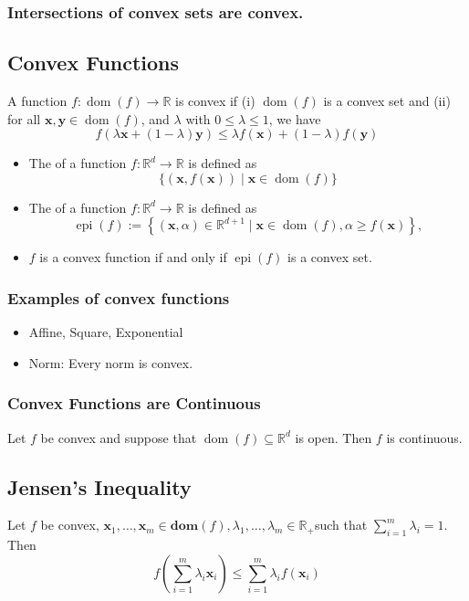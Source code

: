 \subsubsection*{Intersections of convex sets are convex.}

\subsection*{Convex Functions}
A function $f: \operatorname{dom}(f) \rightarrow \mathbb{R}$ is convex if (i) $\operatorname{dom}(f)$ is a convex set and (ii) for all $\mathbf{x}, \mathbf{y} \in \operatorname{dom}(f)$, and $\lambda$ with $0 \leq \lambda \leq 1$, we have
$$
f(\lambda \mathbf{x}+(1-\lambda) \mathbf{y}) \leq \lambda f(\mathbf{x})+(1-\lambda) f(\mathbf{y})
$$

\begin{itemize}[leftmargin=*]
    \item The  of a function $f: \mathbb{R}^{d} \rightarrow \mathbb{R}$ is defined as
        $$
        \{(\mathbf{x}, f(\mathbf{x})) \mid \mathbf{x} \in \operatorname{dom}(f)\}
        $$
    \item The  of a function $f: \mathbb{R}^{d} \rightarrow \mathbb{R}$ is defined as
$$
\operatorname{epi}(f):=\left\{(\mathbf{x}, \alpha) \in \mathbb{R}^{d+1} \mid \mathbf{x} \in \operatorname{dom}(f), \alpha \geq f(\mathbf{x})\right\},
$$
    \item $f$ is a convex function if and only if $\operatorname{epi}(f)$ is a convex set.
\end{itemize}

\subsubsection*{Examples of convex functions} 
\begin{itemize}[leftmargin=*]
    \item Affine, Square, Exponential
    \item Norm: Every norm is convex.
\end{itemize}

\subsubsection*{Convex Functions are Continuous}
Let $f$ be convex and suppose that $\operatorname{dom}(f) \subseteq \mathbb{R}^{d}$ is open. Then $f$ is continuous.

\subsection*{Jensen's Inequality}
Let $f$ be convex, $\mathbf{x}_{1}, \ldots, \mathbf{x}_{m} \in \mathbf{d o m}(f), \lambda_{1}, \ldots, \lambda_{m} \in \mathbb{R}_{+}$such that $\sum_{i=1}^{m} \lambda_{i}=1$. Then
$$
f\left(\sum_{i=1}^{m} \lambda_{i} \mathbf{x}_{i}\right) \leq \sum_{i=1}^{m} \lambda_{i} f\left(\mathbf{x}_{i}\right)
$$

